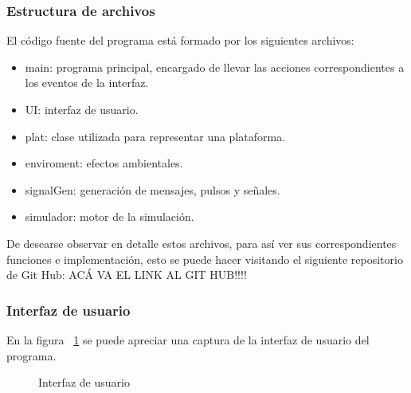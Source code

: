 \documentclass[a4paper,10pt]{article}
\begin{document}
\subsubsection{Estructura de archivos}
El código fuente del programa  está formado por los siguientes archivos:
\begin{itemize}
\item main: programa principal, encargado de llevar las acciones correspondientes a los eventos de la interfaz.
\item UI: interfaz de usuario.
\item plat: clase utilizada para representar una plataforma.
\item enviroment: efectos ambientales.
\item signalGen: generación de mensajes, pulsos y señales.
\item simulador: motor de la simulación.
\end{itemize}
De desearse observar en detalle estos archivos, para así ver sus correspondientes funciones e implementación, esto se puede hacer visitando el siguiente repositorio de Git Hub: ACÁ VA EL LINK AL GIT HUB!!!!

\subsubsection{Interfaz de usuario}
En la figura ~\ref{UI} se puede apreciar una captura de la interfaz de usuario del programa.

\begin{figure}[H]
\centering
{}
\caption{Interfaz de usuario}
\label{UI}
\end{figure}
\end{document}
